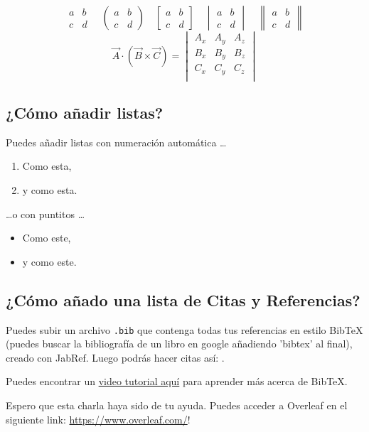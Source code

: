 \documentclass[a4paper]{article}
\begin{document}
$$
\begin{matrix} 
a & b \\
c & d 
\end{matrix}
\quad
\begin{pmatrix} 
a & b \\
c & d 
\end{pmatrix}
\quad
\begin{bmatrix} 
a & b \\
c & d 
\end{bmatrix}
\quad
\begin{vmatrix} 
a & b \\
c & d 
\end{vmatrix}
\quad
\begin{Vmatrix} 
a & b \\
c & d 
\end{Vmatrix}
$$
\begin{equation}
\vec{A}\cdot(\vec{B}\times\vec{C})=\begin{vmatrix}
A_x&A_y&A_z\\
B_x&B_y&B_z\\
C_x&C_y&C_z\\
\end{vmatrix}
\end{equation}

\subsection{¿Cómo añadir listas?}

Puedes añadir listas con numeración automática \dots

\begin{enumerate}
\item Como esta,
\item y como esta.
\end{enumerate}
\dots o con puntitos \dots
\begin{itemize}
\item Como este,
\item y como este.
\end{itemize}

\subsection{¿Cómo añado una lista de Citas y Referencias?}

Puedes subir un archivo \verb|.bib| que contenga todas tus referencias en estilo BibTeX (puedes buscar la bibliografía de un libro en google añadiendo 'bibtex' al final), creado con JabRef. Luego podrás hacer citas así: \cite{Griffiths:1492149}.

Puedes encontrar un \href{https://www.overleaf.com/help/97-how-to-include-a-bibliography-using-bibtex}{video tutorial aquí} para aprender más acerca de BibTeX.

Espero que esta charla haya sido de tu ayuda. Puedes acceder a Overleaf en el siguiente link: \url{https://www.overleaf.com/}!



\end{document}
